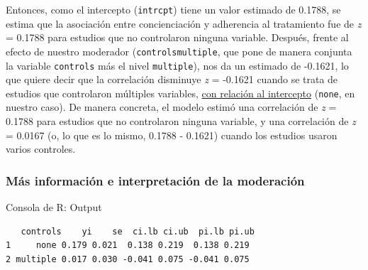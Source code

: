 \documentclass[
  bookmarksnumbered]{article}
\newenvironment{Shaded}{\begin{snugshade}}{\end{snugshade}}
\newcommand{\AttributeTok}[1]{\textcolor[rgb]{0.00,0.34,0.68}{#1}}
\newcommand{\DecValTok}[1]{\textcolor[rgb]{0.69,0.50,0.00}{#1}}
\newcommand{\FunctionTok}[1]{\textcolor[rgb]{0.39,0.29,0.61}{#1}}
\newcommand{\NormalTok}[1]{\textcolor[rgb]{0.12,0.11,0.11}{#1}}
\newcommand{\OtherTok}[1]{\textcolor[rgb]{0.00,0.43,0.16}{#1}}
\newcommand{\SpecialCharTok}[1]{\textcolor[rgb]{0.24,0.68,0.91}{#1}}
\begin{document}
Entonces, como el intercepto (\texttt{intrcpt}) tiene un valor estimado de 0.1788, se estima que la asociación entre concienciación y adherencia al tratamiento fue de \emph{z} = 0.1788 para estudios que no controlaron ninguna variable. Después, frente al efecto de nuestro moderador (\texttt{controlsmultiple}, que pone de manera conjunta la variable \texttt{controls} más el nivel \texttt{multiple}), nos da un estimado de -0.1621, lo que quiere decir que la correlación disminuye \emph{z} = -0.1621 cuando se trata de estudios que controlaron múltiples variables, \underline{con relación al intercepto} (\texttt{none}, en nuestro caso). De manera concreta, el modelo estimó una correlación de \emph{z} = 0.1788 para estudios que no controlaron ninguna variable, y una correlación de \emph{z} = 0.0167 (o, lo que es lo mismo, 0.1788 - 0.1621) cuando los estudios usaron varios controles.

\hypertarget{pred-mods2}{%
\subsubsection{Más información e interpretación de la moderación}\label{pred-mods2}}

\begin{Shaded}
\end{Shaded}

\begin{ROut}{Consola de R: Output~\thetcbcounter}
                \begin{footnotesize}
                \begin{verbatim}   controls    yi    se  ci.lb ci.ub  pi.lb pi.ub
1     none 0.179 0.021  0.138 0.219  0.138 0.219
2 multiple 0.017 0.030 -0.041 0.075 -0.041 0.075
 \end{verbatim}
                \end{footnotesize}
                \end{ROut}
\end{document}
